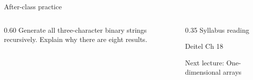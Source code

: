 \documentclass[10pt,aspectratio=169]{beamer}
\begin{document}
\begin{frame}[fragile,t]{After-class practice}
\begin{columns}[T,onlytextwidth]\begin{column}{0.60\textwidth}
Generate all three-character binary strings recursively. Explain why there are eight results.
\end{column}\begin{column}{0.35\textwidth}\small
Syllabus reading\par Deitel Ch 18

Next lecture: One-dimensional arrays
\end{column}\end{columns}
\end{frame}
\end{document}
